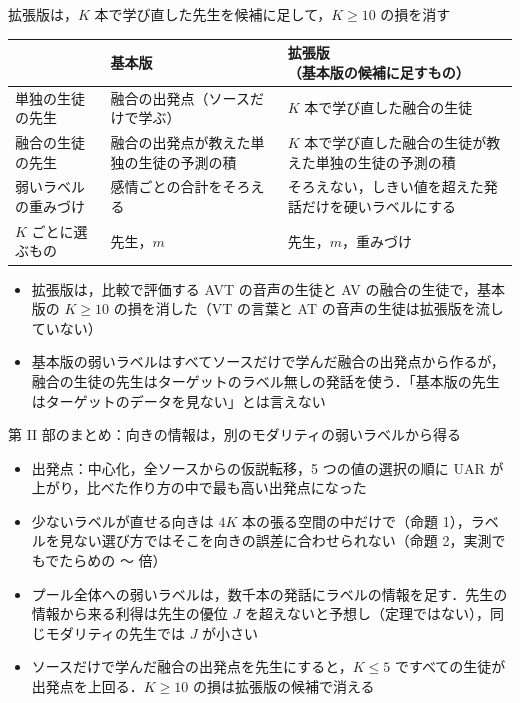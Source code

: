 \begin{frame}{拡張版は，$K$ 本で学び直した先生を候補に足して，$K\ge10$ の損を消す}
  \vspace{0.3em}
  \centering\scriptsize
  \renewcommand{\arraystretch}{1.35}
  \begin{tabularx}{\textwidth}{@{}l X X@{}}
    \toprule
    & \textbf{基本版} & \textbf{拡張版}（基本版の候補に足すもの） \\
    \midrule
    単独の生徒の先生 & 融合の出発点（ソースだけで学ぶ） & $K$ 本で学び直した融合の生徒 \\
    融合の生徒の先生 & 融合の出発点が教えた単独の生徒の予測の積 & $K$ 本で学び直した融合の生徒が教えた単独の生徒の予測の積 \\
    弱いラベルの重みづけ & 感情ごとの合計をそろえる & そろえない，しきい値を超えた発話だけを硬いラベルにする \\
    $K$ ごとに選ぶもの & 先生，$m$ & 先生，$m$，重みづけ \\
    \bottomrule
  \end{tabularx}\par
  \vspace{0.6em}\raggedright
  \begin{itemize}\scriptsize\setlength{\itemsep}{4pt}
    \item 拡張版は，比較で評価する AVT の音声の生徒と AV の融合の生徒で，基本版の $K\ge10$ の損を消した（VT の言葉と AT の音声の生徒は拡張版を流していない）
    \item 基本版の弱いラベルはすべてソースだけで学んだ融合の出発点から作るが，融合の生徒の先生はターゲットのラベル無しの発話を使う．「基本版の先生はターゲットのデータを見ない」とは言えない
  \end{itemize}
\end{frame}

\begin{frame}{第 II 部のまとめ：向きの情報は，別のモダリティの弱いラベルから得る}
  \vspace{0.3em}
  \begin{itemize}\footnotesize\setlength{\itemsep}{7pt}
    \item 出発点：中心化，全ソースからの仮説転移，5 つの値の選択の順に UAR が上がり，比べた作り方の中で最も高い出発点になった
    \item 少ないラベルが直せる向きは $4K$ 本の張る空間の中だけで（命題 1），ラベルを見ない選び方ではそこを向きの誤差に合わせられない（命題 2，実測でもでたらめの 〜 倍）
    \item プール全体への弱いラベルは，数千本の発話にラベルの情報を足す．先生の情報から来る利得は先生の優位 $J$ を超えないと予想し（定理ではない），同じモダリティの先生では $J$ が小さい
    \item ソースだけで学んだ融合の出発点を先生にすると，$K\le5$ ですべての生徒が出発点を上回る．$K\ge10$ の損は拡張版の候補で消える
  \end{itemize}
\end{frame}

